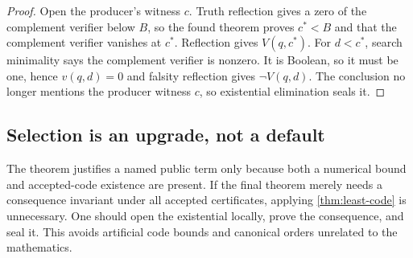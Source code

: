 \begin{proof}
Open the producer's witness \(c\).  Truth reflection gives a zero of the
complement verifier below \(B\), so the found theorem proves
\(c^*<B\) and that the complement verifier vanishes at \(c^*\).  Reflection
gives \(V(q,c^*)\).  For \(d<c^*\), search minimality says the complement
verifier is nonzero.  It is Boolean, so it must be one, hence \(v(q,d)=0\) and
falsity reflection gives \(\neg V(q,d)\).  The conclusion no longer mentions
the producer witness \(c\), so existential elimination seals it.
\end{proof}

\subsection{Selection is an upgrade, not a default}

The theorem justifies a named public term only because both a numerical bound
and accepted-code existence are present.  If the final theorem merely needs a
consequence invariant under all accepted certificates, applying
\cref{thm:least-code} is unnecessary.  One should open the existential locally,
prove the consequence, and seal it.  This avoids artificial code bounds and
canonical orders unrelated to the mathematics.
